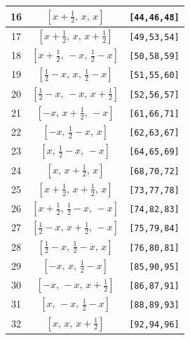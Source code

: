 \documentclass[fleqn,8pt]{jsarticle}
\begin{document}
\begin{longtable}{ccc}
16 & $\left[ x + \frac{1}{2},\, x,\, x \right]$ & {\tt [44,46,48]} \\ \hline
17 & $\left[ x + \frac{1}{2},\, x,\, x + \frac{1}{2} \right]$ & {\tt [49,53,54]} \\ \hline
18 & $\left[ x + \frac{1}{2},\, - x,\, \frac{1}{2} - x \right]$ & {\tt [50,58,59]} \\ \hline
19 & $\left[ \frac{1}{2} - x,\, x,\, \frac{1}{2} - x \right]$ & {\tt [51,55,60]} \\ \hline
20 & $\left[ \frac{1}{2} - x,\, - x,\, x + \frac{1}{2} \right]$ & {\tt [52,56,57]} \\ \hline
21 & $\left[ - x,\, x + \frac{1}{2},\, - x \right]$ & {\tt [61,66,71]} \\ \hline
22 & $\left[ - x,\, \frac{1}{2} - x,\, x \right]$ & {\tt [62,63,67]} \\ \hline
23 & $\left[ x,\, \frac{1}{2} - x,\, - x \right]$ & {\tt [64,65,69]} \\ \hline
24 & $\left[ x,\, x + \frac{1}{2},\, x \right]$ & {\tt [68,70,72]} \\ \hline
25 & $\left[ x + \frac{1}{2},\, x + \frac{1}{2},\, x \right]$ & {\tt [73,77,78]} \\ \hline
26 & $\left[ x + \frac{1}{2},\, \frac{1}{2} - x,\, - x \right]$ & {\tt [74,82,83]} \\ \hline
27 & $\left[ \frac{1}{2} - x,\, x + \frac{1}{2},\, - x \right]$ & {\tt [75,79,84]} \\ \hline
28 & $\left[ \frac{1}{2} - x,\, \frac{1}{2} - x,\, x \right]$ & {\tt [76,80,81]} \\ \hline
29 & $\left[ - x,\, x,\, \frac{1}{2} - x \right]$ & {\tt [85,90,95]} \\ \hline
30 & $\left[ - x,\, - x,\, x + \frac{1}{2} \right]$ & {\tt [86,87,91]} \\ \hline
31 & $\left[ x,\, - x,\, \frac{1}{2} - x \right]$ & {\tt [88,89,93]} \\ \hline
32 & $\left[ x,\, x,\, x + \frac{1}{2} \right]$ & {\tt [92,94,96]} \\
\end{longtable}
\renewcommand{\arraystretch}{1.2}
\end{document}

